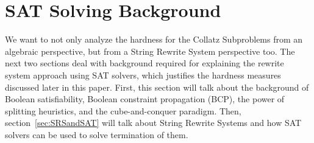 \chapter{SAT Solving Background} \label{sec:SATsolving}
We want to not only analyze the hardness for the Collatz Subproblems from an algebraic perspective, but from a String Rewrite System perspective too. The next two sections deal with background required for explaining the rewrite system approach using SAT solvers, which justifies the hardness measures discussed later in this paper. First, this section will talk about the background of Boolean satisfiability, Boolean constraint propagation (BCP), the power of splitting heuristics, and the cube-and-conquer paradigm. Then, section~\ref{sec:SRSandSAT} will talk about String Rewrite Systems and how SAT solvers can be used to solve termination of them.

